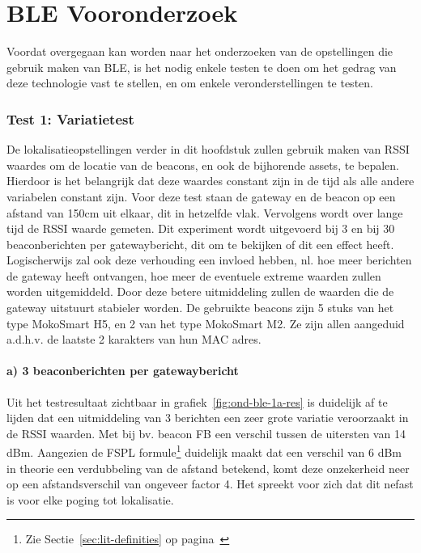 \section{BLE Vooronderzoek}
\label{sec:ond-ble-0}
Voordat overgegaan kan worden naar het onderzoeken van de opstellingen die gebruik maken van BLE, is het nodig enkele testen te doen om het gedrag van deze technologie vast te stellen, en om enkele veronderstellingen te testen.

\subsubsection{Test 1: Variatietest}
\label{sec:ond-ble-0-1}
De lokalisatieopstellingen verder in dit hoofdstuk zullen gebruik maken van RSSI waardes om de locatie van de beacons, en ook de bijhorende assets, te bepalen. Hierdoor is het belangrijk dat deze waardes constant zijn in de tijd als alle andere variabelen constant zijn. 
Voor deze test staan de gateway en de beacon op een afstand van 150cm uit elkaar, dit in hetzelfde vlak. Vervolgens wordt over lange tijd de RSSI waarde gemeten. Dit experiment wordt uitgevoerd bij 3 en bij 30 beaconberichten per gatewaybericht, dit om te bekijken of dit een effect heeft. Logischerwijs zal ook deze verhouding een invloed hebben, nl. hoe meer berichten de gateway heeft ontvangen, hoe meer de eventuele extreme waarden zullen worden uitgemiddeld. Door deze betere uitmiddeling zullen de waarden die de gateway uitstuurt stabieler worden.
De gebruikte beacons zijn 5 stuks van het type MokoSmart H5, en 2 van het type MokoSmart M2. Ze zijn allen aangeduid a.d.h.v. de laatste 2 karakters van hun MAC adres.

\paragraph{a) 3 beaconberichten per gatewaybericht}
Uit het testresultaat zichtbaar in grafiek~\ref{fig:ond-ble-1a-res} is duidelijk af te lijden dat een uitmiddeling van 3 berichten een zeer grote variatie veroorzaakt in de RSSI waarden. Met bij bv. beacon FB een verschil tussen de uitersten van 14 dBm. Aangezien de FSPL formule\footnote{Zie Sectie~\ref{sec:lit-definities} op pagina~\pageref{sec:lit-definities}} duidelijk maakt dat  een verschil van 6 dBm in theorie een verdubbeling van de afstand betekend, komt deze onzekerheid neer op een afstandsverschil van ongeveer factor 4. Het spreekt voor zich dat dit nefast is voor elke poging tot lokalisatie.

